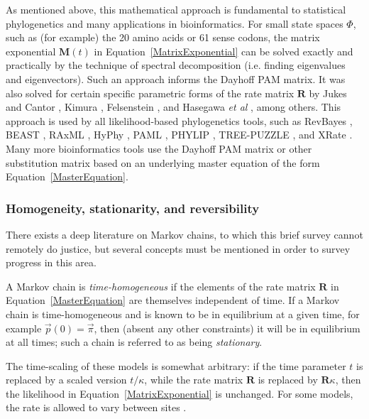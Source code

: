 \documentclass{bmcart}
\newcommand{\matr}[1]{\mathbf{#1}}
\newcommand{\eqref}[1]{Equation~\ref{#1}}
\newcommand{\statespace}{\Phi}
\newcommand{\statevec}{\vec{p}}
\newcommand{\ratematrix}{\matr{R}}
\newcommand{\eqmvec}{\vec{\pi}}
\newcommand{\condmatrix}{\matr{M}}
\begin{document}
As mentioned above, this mathematical approach is fundamental to statistical phylogenetics
and many applications in bioinformatics.
For small state spaces $\statespace$, such as (for example) the 20 amino acids or 61 sense codons,
the matrix exponential $\condmatrix(t)$ in \eqref{MatrixExponential} can be solved exactly and practically
by the technique of spectral decomposition (i.e. finding eigenvalues and eigenvectors).
Such an approach informs the Dayhoff PAM matrix.
It was also solved for certain specific parametric forms of the rate matrix $\ratematrix$
by Jukes and Cantor \cite{JukesCantor69}, Kimura \cite{Kimura80}, Felsenstein \cite{Felsenstein81},
and Hasegawa {\em et al} \cite{HasegawaEtal85}, among others.
This approach is used by all likelihood-based phylogenetics tools, such as
RevBayes \cite{HohnaEtAl2016},
BEAST \cite{pmid17996036},
RAxML \cite{pmid16928733},
HyPhy \cite{pmid15509596},
PAML \cite{pmid17483113},
PHYLIP \cite{Felsenstein1989},
TREE-PUZZLE \cite{pmid11934758},
and XRate \cite{pmid22693624}.
Many more bioinformatics tools use the Dayhoff PAM matrix or other substitution matrix
based on an underlying master equation of the form \eqref{MasterEquation}.

\color{red}
\subsubsection*{Homogeneity, stationarity, and reversibility}

There exists a deep literature on Markov chains, to which this brief survey cannot remotely do justice,
but several concepts must be mentioned in order to survey progress in this area.

A Markov chain is {\em time-homogeneous} if the elements of the
rate matrix $\ratematrix$ in \eqref{MasterEquation} are themselves independent of time.
If a Markov chain is time-homogeneous and is known to be in equilibrium at a given time,
for example $\statevec(0) = \eqmvec$,
then (absent any other constraints) it will be in equilibrium at all times;
such a chain is referred to as being {\em stationary}.

The time-scaling of these models is somewhat arbitrary:
if the time parameter $t$ is replaced by a scaled version $t/\kappa$,
while the rate matrix $\ratematrix$ is replaced by $\ratematrix \kappa$,
then the likelihood in \eqref{MatrixExponential} is unchanged.
For some models, the rate is allowed to vary between sites \cite{Yang93,Yang94}.
\end{document}
